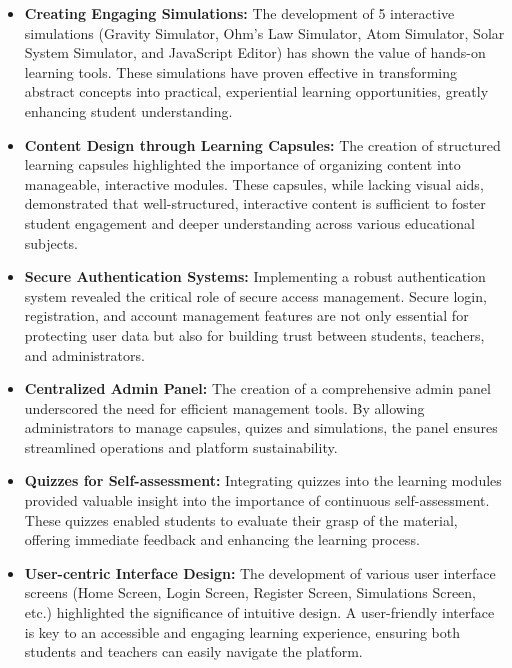 \begin{itemize}[leftmargin=1cm]
    \item \textbf{Creating Engaging Simulations:} The development of 5 interactive simulations (Gravity Simulator, Ohm's Law Simulator, Atom Simulator, Solar System Simulator, and JavaScript Editor) has shown the value of hands-on learning tools. These simulations have proven effective in transforming abstract concepts into practical, experiential learning opportunities, greatly enhancing student understanding.
    
    \item \textbf{Content Design through Learning Capsules:} The creation of structured learning capsules highlighted the importance of organizing content into manageable, interactive modules. These capsules, while lacking visual aids, demonstrated that well-structured, interactive content is sufficient to foster student engagement and deeper understanding across various educational subjects.
    
    \item \textbf{Secure Authentication Systems:} Implementing a robust authentication system revealed the critical role of secure access management. Secure login, registration, and account management features are not only essential for protecting user data but also for building trust between students, teachers, and administrators. 
    
    \item \textbf{Centralized Admin Panel:} The creation of a comprehensive admin panel underscored the need for efficient management tools. By allowing administrators to manage capsules, quizes and simulations, the panel ensures streamlined operations and platform sustainability.
    
    \item \textbf{Quizzes for Self-assessment:} Integrating quizzes into the learning modules provided valuable insight into the importance of continuous self-assessment. These quizzes enabled students to evaluate their grasp of the material, offering immediate feedback and enhancing the learning process.
    
    \item \textbf{User-centric Interface Design:} The development of various user interface screens (Home Screen, Login Screen, Register Screen, Simulations Screen, etc.) highlighted the significance of intuitive design. A user-friendly interface is key to an accessible and engaging learning experience, ensuring both students and teachers can easily navigate the platform.
\end{itemize}

